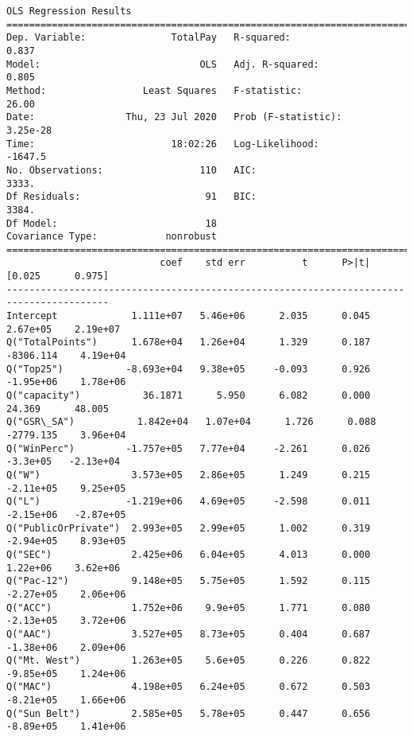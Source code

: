 \documentclass[11pt]{article}
\begin{document}
    \begin{Verbatim}[commandchars=\\\{\}]
                            OLS Regression Results                            
==============================================================================
Dep. Variable:               TotalPay   R-squared:                       0.837
Model:                            OLS   Adj. R-squared:                  0.805
Method:                 Least Squares   F-statistic:                     26.00
Date:                Thu, 23 Jul 2020   Prob (F-statistic):           3.25e-28
Time:                        18:02:26   Log-Likelihood:                -1647.5
No. Observations:                 110   AIC:                             3333.
Df Residuals:                      91   BIC:                             3384.
Df Model:                          18                                         
Covariance Type:            nonrobust                                         
========================================================================================
                           coef    std err          t      P>|t|      [0.025      0.975]
----------------------------------------------------------------------------------------
Intercept             1.111e+07   5.46e+06      2.035      0.045    2.67e+05    2.19e+07
Q("TotalPoints")      1.678e+04   1.26e+04      1.329      0.187   -8306.114    4.19e+04
Q("Top25")           -8.693e+04   9.38e+05     -0.093      0.926   -1.95e+06    1.78e+06
Q("capacity")           36.1871      5.950      6.082      0.000      24.369      48.005
Q("GSR\_SA")           1.842e+04   1.07e+04      1.726      0.088   -2779.135    3.96e+04
Q("WinPerc")         -1.757e+05   7.77e+04     -2.261      0.026    -3.3e+05   -2.13e+04
Q("W")                3.573e+05   2.86e+05      1.249      0.215   -2.11e+05    9.25e+05
Q("L")               -1.219e+06   4.69e+05     -2.598      0.011   -2.15e+06   -2.87e+05
Q("PublicOrPrivate")  2.993e+05   2.99e+05      1.002      0.319   -2.94e+05    8.93e+05
Q("SEC")              2.425e+06   6.04e+05      4.013      0.000    1.22e+06    3.62e+06
Q("Pac-12")           9.148e+05   5.75e+05      1.592      0.115   -2.27e+05    2.06e+06
Q("ACC")              1.752e+06    9.9e+05      1.771      0.080   -2.13e+05    3.72e+06
Q("AAC")              3.527e+05   8.73e+05      0.404      0.687   -1.38e+06    2.09e+06
Q("Mt. West")         1.263e+05    5.6e+05      0.226      0.822   -9.85e+05    1.24e+06
Q("MAC")              4.198e+05   6.24e+05      0.672      0.503   -8.21e+05    1.66e+06
Q("Sun Belt")         2.585e+05   5.78e+05      0.447      0.656   -8.89e+05    1.41e+06

\end{Verbatim}
\end{document}

